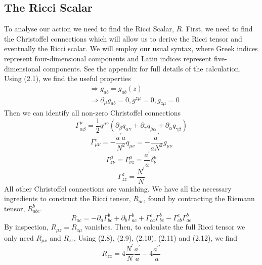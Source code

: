 \documentclass[11pt]{report}
\numberwithin{equation}{chapter}
\begin{document}
\subsection{The Ricci Scalar}
To analyse our action we need to find the Ricci Scalar, $R$. First, we need to find the Christoffel connections which will allow us to derive the Ricci tensor and eventually the Ricci scalar. We will employ our usual syntax, where Greek indices represent four-dimensional components and Latin indices represent five-dimensional components. See the appendix for full details of the calculation. Using (2.1), we find the useful properties
\begin{equation}
    \begin{aligned}
& \Rightarrow g_{a b}=g_{a b}(z) \\
& \Rightarrow \partial_\mu g_{a b}=0, g^{z \mu}=0, g_{z \mu}=0
\end{aligned}
\end{equation}
Then we can identify all non-zero Christoffel connections
\begin{equation}
    \Gamma_{\alpha \beta}^\mu= \frac{1}{2} q^{\mu \gamma}(\partial_\beta q_{\alpha \gamma}+\partial_\gamma q_{\beta \alpha}+\partial_\alpha q_{\gamma \beta})
\end{equation}
\begin{equation}
    \Gamma_{\mu \nu}^z= -\frac{a^\prime a}{N^2}q_{\mu \nu} = -\frac{a^\prime}{aN^2}g_{\mu \nu}
\end{equation}
\begin{equation}
    \Gamma_{z \nu}^{\mu} = \Gamma_{\nu z}^{\mu} = \frac{a^\prime}{a}\delta_{\nu}^{\mu}
\end{equation}
\begin{equation}
    \Gamma_{zz}^z = \frac{N^\prime}{N}
\end{equation} 
All other Christoffel connections are vanishing. We have all the necessary ingredients to construct the Ricci tensor, $R_{ac}$, found by contracting the Riemann tensor, $R_{abc}^b$.
\begin{equation}
    R_{ac} = -\partial_{a}\Gamma_{bc}^b + \partial_{b}\Gamma_{ac}^b + \Gamma_{ca}^e\Gamma_{be}^b - \Gamma_{cb}^e\Gamma_{ae}^b
\end{equation}
By inspection, $R_{\mu z} = R_{z\mu}$ vanishes. Then, to calculate the full Ricci tensor we only need $R_{\mu \nu}$ and $R_{zz}$. Using (2.8), (2.9), (2.10), (2.11) and (2.12), we find
\begin{equation}
    R_{zz} = 4\frac{N^\prime}{N}\frac{a^\prime}{a} - 4\frac{a^{\prime\prime}}{a}
\end{equation}
\end{document}

